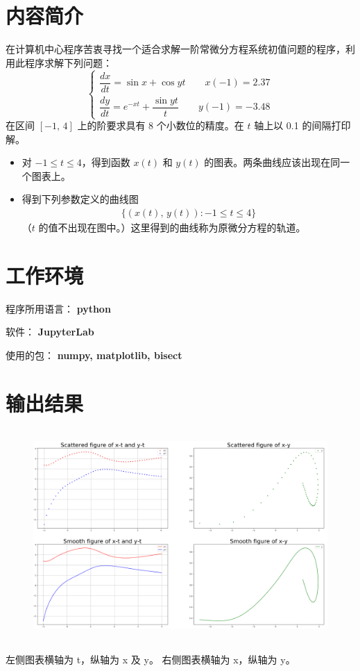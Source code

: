 \documentclass{ctexart}
\begin{document}
\section*{内容简介}
	\noindent 在计算机中心程序苦衷寻找一个适合求解一阶常微分方程系统初值问题的程序，利用此程序求解下列问题：
	\begin{equation}
	\begin{cases}
		\dfrac{dx}{dt} = \sin x + \cos yt \qquad x(-1) = 2.37 \\[5mm]
		\dfrac{dy}{dt} = e^{-xt} + \dfrac{\sin yt}{t} \qquad y(-1) = -3.48
	\end{cases} 
	\end{equation}
	在区间 $[-1,\,4]$ 上的阶要求具有 8 个小数位的精度。在 $t$ 轴上以 0.1 的间隔打印解。
	\begin{itemize}
		\item 对 $-1 \leqslant t \leqslant 4$，得到函数 $x(t)$ 和 $y(t)$ 的图表。两条曲线应该出现在同一个图表上。
		\item 得到下列参数定义的曲线图
		\begin{gather*}
			\{ (x(t),\,y(t)) : -1 \leqslant t \leqslant 4 \}
		\end{gather*}
		（$t$ 的值不出现在图中。）这里得到的曲线称为原微分方程的轨道。
	\end{itemize}
	
	
\section*{工作环境}

	程序所用语言： {\bf python}
	
	软件： {\bf JupyterLab}
	
	使用的包： {\bf numpy, matplotlib, bisect }

\section*{输出结果}

\begin{figure}[H]
	\centering
	\includegraphics[width = 15cm, height = 8cm]{figure.png}
\end{figure}
	左侧图表横轴为 t，纵轴为 x 及 y。 右侧图表横轴为 x，纵轴为 y。
\end{document}
